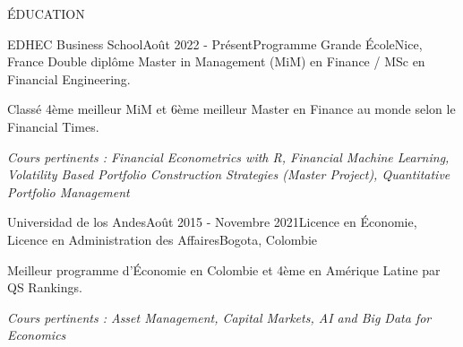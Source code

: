\documentclass{resume} %
\begin{document}
%
%

\begin{rSection}{ÉDUCATION}

\vspace{0.3em}
\begin{rSubsection}{EDHEC Business School}{Août 2022 - Présent}{Programme Grande École}{Nice, France}
    Double diplôme Master in Management (MiM) en Finance / MSc en Financial Engineering.
    \item Classé 4ème meilleur MiM et 6ème meilleur Master en Finance au monde selon le Financial Times.
    \item \textit{Cours pertinents : Financial Econometrics with R, Financial Machine Learning, Volatility Based Portfolio Construction Strategies (Master Project), Quantitative Portfolio Management}
\end{rSubsection}

\begin{rSubsection}{Universidad de los Andes}{Août 2015 - Novembre 2021}{Licence en Économie, Licence en Administration des Affaires}{Bogota, Colombie}
    \item Meilleur programme d'Économie en Colombie et 4ème en Amérique Latine par QS Rankings.
    \item \textit{Cours pertinents : Asset Management, Capital Markets, AI and Big Data for Economics}
\end{rSubsection}

\end{rSection}

\vspace{0.5em}

%
%
\end{document}
